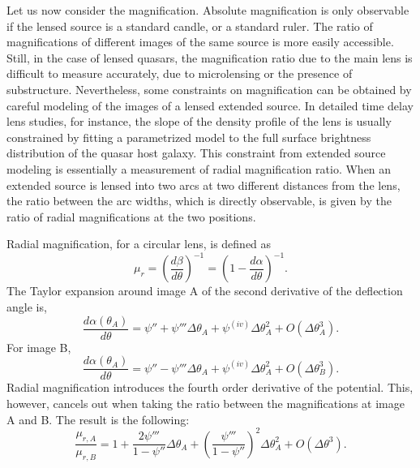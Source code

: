 \documentclass[usenatbib]{mnras}
\def\psiii{\psi''}
\def\psiiii{\psi'''}
\def\psiiv{\psi^{(iv)}}
\begin{document}
Let us now consider the magnification. Absolute magnification is only observable if the lensed source is a standard candle, or a standard ruler.
The ratio of magnifications of different images of the same source is more easily accessible. Still, in the case of lensed quasars, the magnification ratio due to the main lens is difficult to measure accurately, due to microlensing or the presence of substructure.
Nevertheless, some constraints on magnification can be obtained by careful modeling of the images of a lensed extended source.
In detailed time delay lens studies, for instance, the slope of the density profile of the lens is usually constrained by fitting a parametrized model to the full surface brightness distribution of the quasar host galaxy. %
This constraint from extended source modeling is essentially a measurement of radial magnification ratio. 
When an extended source is lensed into two arcs at two different distances from the lens, the ratio between the arc widths, which is directly observable, is given by the ratio of radial magnifications at the two positions.

Radial magnification, for a circular lens, is defined as
\begin{equation}
\mu_r = \left(\frac{d\beta}{d\theta}\right)^{-1} = \left(1 - \frac{d\alpha}{d\theta}\right)^{-1}.
\end{equation}
The Taylor expansion around image A of the second derivative of the deflection angle is,
\begin{equation}
\frac{d\alpha(\theta_A)}{d\theta} = \psiii + \psiiii\Delta\theta_A + \psiiv\Delta\theta_A^2 + O(\Delta\theta_A^3).
\end{equation}
For image B,
\begin{equation}
\frac{d\alpha(\theta_A)}{d\theta} = \psiii - \psiiii\Delta\theta_A + \psiiv\Delta\theta_A^2 + O(\Delta\theta_B^3).
\end{equation}
Radial magnification introduces the fourth order derivative of the potential. This, however, cancels out when taking the ratio between the magnifications at image A and B. The result is the following:
\begin{equation}\label{eq:radmagrat}
\frac{\mu_{r,A}}{\mu_{r,B}} = 1 + \frac{2\psiiii}{1-\psiii}\Delta\theta_A + \left(\frac{\psiiii}{1-\psiii}\right)^2\Delta\theta_A^2 + O(\Delta\theta^3).
\end{equation}
\end{document}
